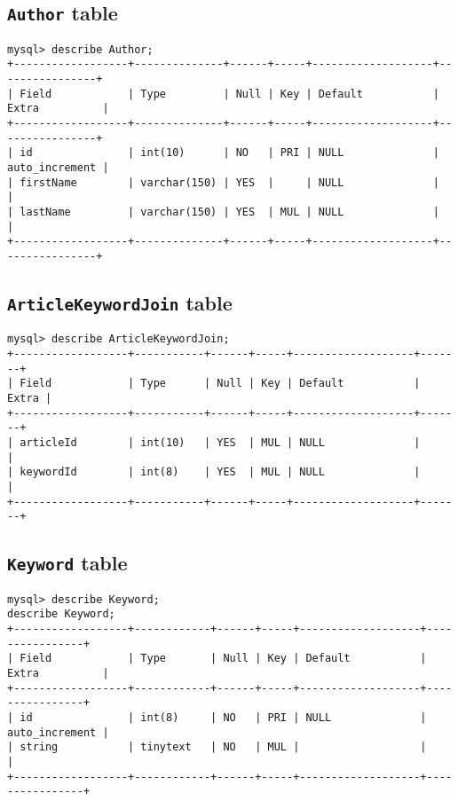 {\subsection{{\tt Author} table}
\begin{verbatim}
mysql> describe Author;
+------------------+--------------+------+-----+-------------------+----------------+
| Field            | Type         | Null | Key | Default           | Extra          |
+------------------+--------------+------+-----+-------------------+----------------+
| id               | int(10)      | NO   | PRI | NULL              | auto_increment | 
| firstName        | varchar(150) | YES  |     | NULL              |                | 
| lastName         | varchar(150) | YES  | MUL | NULL              |                | 
+------------------+--------------+------+-----+-------------------+----------------+
\end{verbatim}

\subsection{{\tt ArticleKeywordJoin} table}
\begin{verbatim}
mysql> describe ArticleKeywordJoin;
+------------------+-----------+------+-----+-------------------+-------+
| Field            | Type      | Null | Key | Default           | Extra |
+------------------+-----------+------+-----+-------------------+-------+
| articleId        | int(10)   | YES  | MUL | NULL              |       | 
| keywordId        | int(8)    | YES  | MUL | NULL              |       | 
+------------------+-----------+------+-----+-------------------+-------+
\end{verbatim}

\subsection{{\tt Keyword} table}
\begin{verbatim}
mysql> describe Keyword;
describe Keyword;
+------------------+------------+------+-----+-------------------+----------------+
| Field            | Type       | Null | Key | Default           | Extra          |
+------------------+------------+------+-----+-------------------+----------------+
| id               | int(8)     | NO   | PRI | NULL              | auto_increment | 
| string           | tinytext   | NO   | MUL |                   |                | 
+------------------+------------+------+-----+-------------------+----------------+
\end{verbatim}

}
